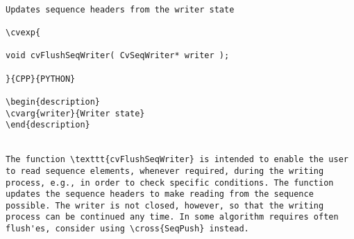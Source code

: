 \begin{verbatim}

Updates sequence headers from the writer state

\cvexp{

void cvFlushSeqWriter( CvSeqWriter* writer );

}{CPP}{PYTHON}

\begin{description}
\cvarg{writer}{Writer state}
\end{description}


The function \texttt{cvFlushSeqWriter} is intended to enable the user to read sequence elements, whenever required, during the writing process, e.g., in order to check specific conditions. The function updates the sequence headers to make reading from the sequence possible. The writer is not closed, however, so that the writing process can be continued any time. In some algorithm requires often flush'es, consider using \cross{SeqPush} instead.


\end{verbatim}
